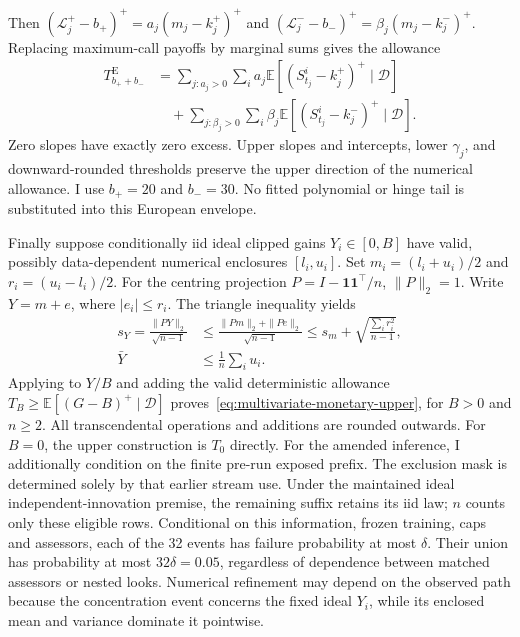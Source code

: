 \documentclass[11pt]{article}
\newcommand{\E}{\mathbb E}
\begin{document}
Then $(\mathcal L_j^+-b_+)^+=a_j(m_j-k_j^+)^+$ and $(\mathcal L_j^--b_-)^+=\beta_j(m_j-k_j^-)^+$. Replacing maximum-call payoffs by marginal sums gives the allowance
\begin{equation}
\begin{aligned}
 T^{\mathrm E}_{b_++b_-}
 &=\sum_{j:a_j>0}\sum_i a_j\E[(S^i_{t_j}-k_j^+)^+\mid\mathcal D]\\
 &\quad+\sum_{j:\beta_j>0}\sum_i\beta_j\E[(S^i_{t_j}-k_j^-)^+\mid\mathcal D].
\end{aligned}
\label{eq:european-tail-allowance}
\end{equation}
Zero slopes have exactly zero excess. Upper slopes and intercepts, lower $\gamma_j$, and downward-rounded thresholds preserve the upper direction of the numerical allowance. I use $b_+=20$ and $b_-=30$. No fitted polynomial or hinge tail is substituted into this European envelope.

Finally suppose conditionally iid ideal clipped gains $Y_i\in[0,B]$ have valid, possibly data-dependent numerical enclosures $[l_i,u_i]$. Set $m_i=(l_i+u_i)/2$ and $r_i=(u_i-l_i)/2$. For the centring projection $P=I-\mathbf1\mathbf1^\top/n$, $\|P\|_2=1$. Write $Y=m+e$, where $|e_i|\leq r_i$. The triangle inequality yields
\begin{equation}
\begin{aligned}
 s_Y=\frac{\|PY\|_2}{\sqrt{n-1}}
 &\leq\frac{\|Pm\|_2+\|Pe\|_2}{\sqrt{n-1}}
 \leq s_m+\sqrt{\frac{\sum_i r_i^2}{n-1}},\\
 \bar Y&\leq\frac1n\sum_i u_i.
\end{aligned}
\label{eq:interval-variance-enclosure}
\end{equation}
Applying \citet[Theorem~4]{maurer2009} to $Y/B$ and adding the valid deterministic allowance $T_B\geq\E[(G-B)^+\mid\mathcal D]$ proves~\eqref{eq:multivariate-monetary-upper}, for $B>0$ and $n\geq2$. All transcendental operations and additions are rounded outwards. For $B=0$, the upper construction is $T_0$ directly. For the amended inference, I additionally condition on the finite pre-run exposed prefix. The exclusion mask is determined solely by that earlier stream use. Under the maintained ideal independent-innovation premise, the remaining suffix retains its iid law; $n$ counts only these eligible rows. Conditional on this information, frozen training, caps and assessors, each of the 32 events has failure probability at most $\delta$. Their union has probability at most $32\delta=0.05$, regardless of dependence between matched assessors or nested looks. Numerical refinement may depend on the observed path because the concentration event concerns the fixed ideal $Y_i$, while its enclosed mean and variance dominate it pointwise.
\end{document}

